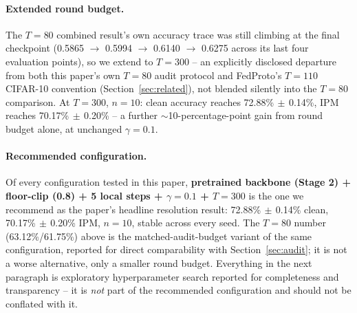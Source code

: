 \documentclass{article}
\begin{document}
\paragraph{Extended round budget.} The $T{=}80$ combined result's own accuracy
trace was still climbing at the final checkpoint (0.5865 $\to$ 0.5994 $\to$
0.6140 $\to$ 0.6275 across its last four evaluation points), so we extend to
$T{=}300$ -- an explicitly disclosed departure from both this paper's own
$T{=}80$ audit protocol and FedProto's $T{=}110$ CIFAR-10 convention
(Section~\ref{sec:related}), not blended silently into the $T{=}80$ comparison.
At $T{=}300$, $n{=}10$: clean accuracy reaches 72.88\%$\,\pm\,$0.14\%, IPM
reaches 70.17\%$\,\pm\,$0.20\% -- a further $\sim$10-percentage-point gain from
round budget alone, at unchanged $\gamma{=}0.1$.

\paragraph{Recommended configuration.} Of every configuration tested in this
paper, \textbf{pretrained backbone (Stage 2) + floor-clip (0.8) + 5 local steps
+ $\gamma{=}0.1$ + $T{=}300$} is the one we recommend as the paper's headline
resolution result: 72.88\%$\,\pm\,$0.14\% clean, 70.17\%$\,\pm\,$0.20\% IPM,
$n{=}10$, stable across every seed. The $T{=}80$ number
(63.12\%/61.75\%) above is the matched-audit-budget variant of the same
configuration, reported for direct comparability with Section~\ref{sec:audit};
it is not a worse alternative, only a smaller round budget. Everything in the
next paragraph is exploratory hyperparameter search reported for completeness
and transparency -- it is \emph{not} part of the recommended configuration and
should not be conflated with it.
\end{document}
